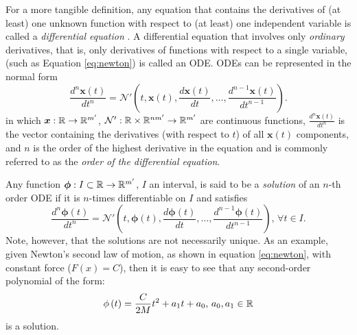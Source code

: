 For a more tangible definition, any equation that contains the derivatives of (at least) one unknown function with respect to (at least) one independent variable is called a \emph{differential equation} \cite{zill_first_2013}.
A differential equation that involves only \emph{ordinary} derivatives, that is, only derivatives of functions with respect to a single variable, (such as Equation \eqref{eq:newton}) is called an \gls{ODE}.
\gls{ODE}s can be represented in the normal form \[
    \frac{d^n \bm{x}(t)}{d t^{n}} = \mathcal{N}'\left( t, \bm{x}\left( t \right), \frac{d \bm{x}(t)}{d t}, \ldots,\frac{d^{n-1}\bm{x}(t)}{d t^{n-1}} \right)
.\] 
in which $\bm{x}:\mathbb{R}\to \mathbb{R}^{m'} $, $\mathcal{N}':\mathbb{R}\times \mathbb{R}^{nm'}\to \mathbb{R}^{m'}$ are continuous functions, $\frac{d^n \bm{x}(t)}{d t^{n}}$ is the vector containing the derivatives (with respect to $t$) of all $\bm{x}\left( t \right) $ components, and $n$ is the order of the highest derivative in the equation and is commonly referred to as the \emph{order of the differential equation}.

Any function $\bm{\phi}:I\subset\mathbb{R}\to \mathbb{R}^{m'}$, $I$ an interval, is said to be a \emph{solution} of an $n$-th order \gls{ODE} if it is $n$-times differentiable on $I$ and satisfies
\[
    \frac{d^n \bm{\phi}(t)}{d t^{n}} = \mathcal{N}'\left( t, \bm{\phi}\left( t \right) , \frac{d \bm{\phi}(t)}{d t}, \ldots,\frac{d^{n-1}\bm{\phi}(t)}{d t^{n-1}} \right),\,\forall t\in I
.\]
Note, however, that the solutions are not necessarily unique.
As an example, given Newton's second law of motion, as shown in equation \eqref{eq:newton}, with constant force ($F(x)=C$), then it is easy to see that any second-order polynomial of the form:
\[
    \phi\left( t \right) = \frac{C}{2M}t^2 + a_1t + a_0,\, a_0,a_1\in \mathbb{R}
\]
is a solution.

